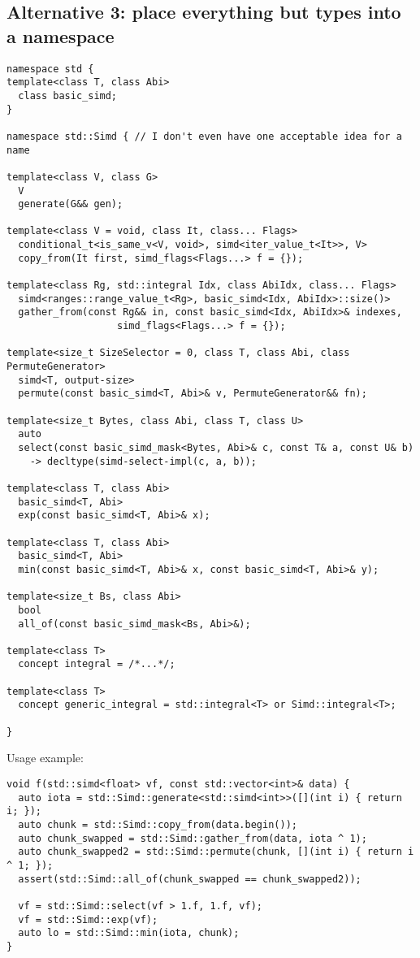 \subsection{Alternative 3: place everything but types into a namespace}

\medskip\begin{lstlisting}[style=Vc]
namespace std {
template<class T, class Abi>
  class basic_simd;
}

namespace std::Simd { // I don't even have one acceptable idea for a name

template<class V, class G>
  V
  generate(G&& gen);

template<class V = void, class It, class... Flags>
  conditional_t<is_same_v<V, void>, simd<iter_value_t<It>>, V>
  copy_from(It first, simd_flags<Flags...> f = {});

template<class Rg, std::integral Idx, class AbiIdx, class... Flags>
  simd<ranges::range_value_t<Rg>, basic_simd<Idx, AbiIdx>::size()>
  gather_from(const Rg&& in, const basic_simd<Idx, AbiIdx>& indexes,
                   simd_flags<Flags...> f = {});

template<size_t SizeSelector = 0, class T, class Abi, class PermuteGenerator>
  simd<T, output-size>
  permute(const basic_simd<T, Abi>& v, PermuteGenerator&& fn);

template<size_t Bytes, class Abi, class T, class U>
  auto
  select(const basic_simd_mask<Bytes, Abi>& c, const T& a, const U& b)
    -> decltype(simd-select-impl(c, a, b));

template<class T, class Abi>
  basic_simd<T, Abi>
  exp(const basic_simd<T, Abi>& x);

template<class T, class Abi>
  basic_simd<T, Abi>
  min(const basic_simd<T, Abi>& x, const basic_simd<T, Abi>& y);

template<size_t Bs, class Abi>
  bool
  all_of(const basic_simd_mask<Bs, Abi>&);

template<class T>
  concept integral = /*...*/;

template<class T>
  concept generic_integral = std::integral<T> or Simd::integral<T>;

}
\end{lstlisting}

Usage example:
\medskip\begin{lstlisting}[style=Vc]
void f(std::simd<float> vf, const std::vector<int>& data) {
  auto iota = std::Simd::generate<std::simd<int>>([](int i) { return i; });
  auto chunk = std::Simd::copy_from(data.begin());
  auto chunk_swapped = std::Simd::gather_from(data, iota ^ 1);
  auto chunk_swapped2 = std::Simd::permute(chunk, [](int i) { return i ^ 1; });
  assert(std::Simd::all_of(chunk_swapped == chunk_swapped2));

  vf = std::Simd::select(vf > 1.f, 1.f, vf);
  vf = std::Simd::exp(vf);
  auto lo = std::Simd::min(iota, chunk);
}
\end{lstlisting}

